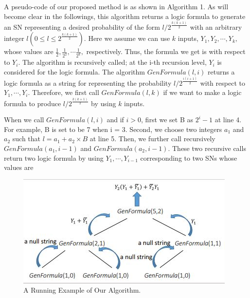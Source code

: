 \documentclass[10pt,conference]{IEEEtran}
\begin{document}
\par
A pseudo-code of our proposed method is as shown in
Algorithm 1. As will become clear in the followings, this
algorithm returns a logic formula to generate an SN representing
a desired probability of the form $l/2^{\frac{k(k+1)}{2}}$ with an
arbitrary integer $l (0 \leq l \leq 2^{\frac{k(k+1)}{2}})$. Here we assume we can
use $k$ inputs, $Y_1, Y_2, \cdots , Y_k,$ whose values are $\frac{1}{2},\frac{1}{2^2}, \cdots \frac{1}{2^k},$ respectively. Thus, the formula we get is with respect to
$Y_i$. The algorithm is recursively called; at the i-th recursion
level, $Y_i$ is considered for the logic formula. The algorithm
${GenFormula(l, i)}$ returns a logic formula as a string for representing
the probability $l/2^{\frac{i(i+1)}{2}}$ with respect to $Y_1, \cdots, Y_i.$
Therefore, we first call ${GenFormula(l,k)}$ if we want to make
a logic formula to produce $l/2^{\frac{k(k+1)}{2}}$ by using $k$ inputs.

\par
When we call ${GenFormula(l,i)}$ and if $i > 0$, first we
set B as $2^i - 1$ at line 4. For example, B is set to be 7
when i = 3. Second, we choose two integers $a_1$ and $a_2$ such
that $l = a_1 + a_2 \times B$ at line 5. Then, we further call recursively
${GenFormula(a_1,i-1)}$ and ${GenFormula(a_2,i-1)}$.
These two recursive calls return two logic formula by using
$Y_1, \cdots , Y_{i-1}$ corresponding to two SNs whose values are

\begin{figure}[t]
\includegraphics[width=\linewidth]{fig5.png}
\caption{ A Running Example of Our Algorithm.}
\end{figure}
\end{document}
